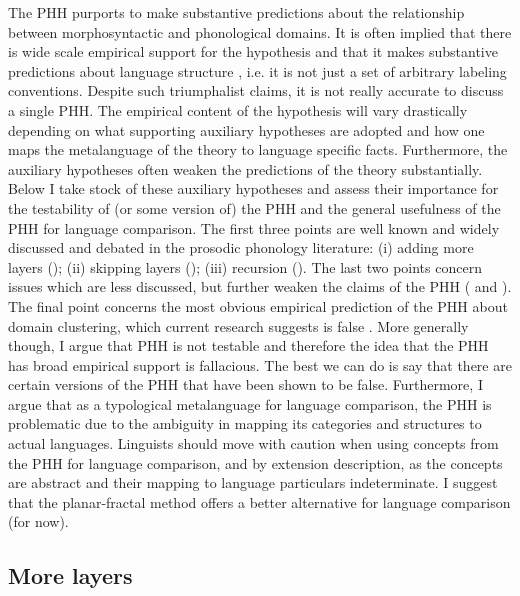 \documentclass[output=paper,hidelinks]{langscibook}
\begin{document}
The PHH purports to make substantive predictions about the relationship between morphosyntactic and phonological domains. It is often implied that there is wide scale empirical support for the hypothesis and that it makes substantive predictions about language structure \citep{bennett2019syntax}, i.e. it is not just a set of arbitrary labeling conventions. Despite such triumphalist claims, it is not really accurate to discuss a single PHH. The empirical content of the hypothesis will vary drastically depending on what supporting auxiliary hypotheses are adopted and how one maps the metalanguage of the theory to language specific facts. Furthermore, the auxiliary hypotheses often weaken the predictions of the theory substantially. Below I take stock of these auxiliary hypotheses and assess their importance for the testability of (or some version of) the PHH and the general usefulness of the PHH for language comparison. 
The first three points are well known and widely discussed and debated in the prosodic phonology literature: (i) adding more layers (); (ii) skipping layers (); (iii) recursion (). The last two points concern issues which are less discussed, but further weaken the claims of the PHH ( and ). The final point concerns the most obvious empirical prediction of the PHH about domain clustering, which current research suggests is false \citep{bickel2009distribution}. More generally though, I argue that PHH is not testable and therefore the idea that the PHH has broad empirical support is fallacious. The best we can do is say that there are certain versions of the PHH that have been shown to be false. Furthermore, I argue that as a typological metalanguage for language comparison, the PHH is problematic due to the ambiguity in mapping its categories and structures to actual languages. Linguists should move with caution when using concepts from the PHH for language comparison, and by extension description, as the concepts are abstract and their mapping to language particulars indeterminate. I suggest that the planar-fractal method offers a better alternative for language comparison (for now).

\subsection{More layers} 
\label{sec:morelayers}
\end{document}
